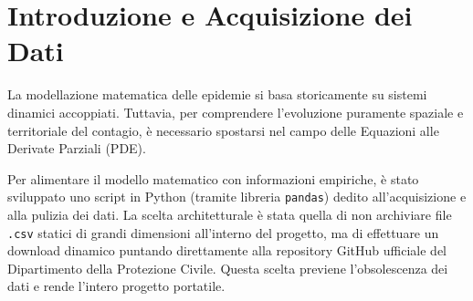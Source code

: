 \documentclass[12pt,a4paper]{article}
\begin{document}
\newpage
\tableofcontents
\newpage


\section{Introduzione e Acquisizione dei Dati}
La modellazione matematica delle epidemie si basa storicamente su sistemi dinamici accoppiati. Tuttavia, per comprendere l'evoluzione puramente spaziale e territoriale del contagio, è necessario spostarsi nel campo delle Equazioni alle Derivate Parziali (PDE). 

Per alimentare il modello matematico con informazioni empiriche, è stato sviluppato uno script in Python (tramite libreria \texttt{pandas}) dedito all'acquisizione e alla pulizia dei dati. La scelta architetturale è stata quella di non archiviare file \texttt{.csv} statici di grandi dimensioni all'interno del progetto, ma di effettuare un download dinamico puntando direttamente alla repository GitHub ufficiale del Dipartimento della Protezione Civile. Questa scelta previene l'obsolescenza dei dati e rende l'intero progetto portatile.
\end{document}
